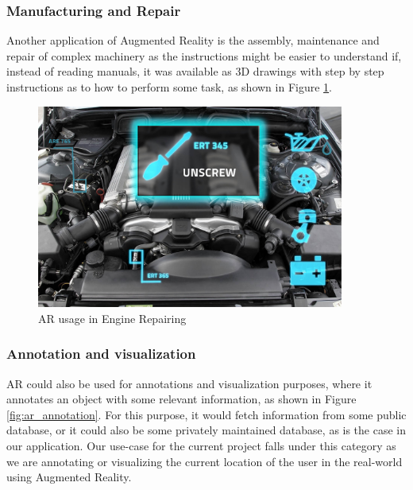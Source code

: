 \subsubsection{Manufacturing and Repair}
Another application of Augmented Reality is the assembly, maintenance and repair of complex machinery as the instructions might be easier to understand if, instead of reading manuals, it was available as 3D drawings with step by step instructions as to how to perform some task, as shown in Figure \ref{fig:ar_repair}.

\begin{figure}[H]
    \centering
        \includegraphics[width=0.90\textwidth]{images/ar_repair.jpg}
    \caption{AR usage in Engine Repairing}
    \label{fig:ar_repair}
\end{figure}


\subsubsection{Annotation and visualization}
AR could also be used for annotations and visualization purposes, where it annotates an object with some relevant information, as shown in Figure \ref{fig:ar_annotation}. For this purpose, it would fetch information from some public database, or it could also be some privately maintained database, as is the case in our application. Our use-case for the current project falls under this category as we are annotating or visualizing the current location of the user in the real-world using Augmented Reality.


